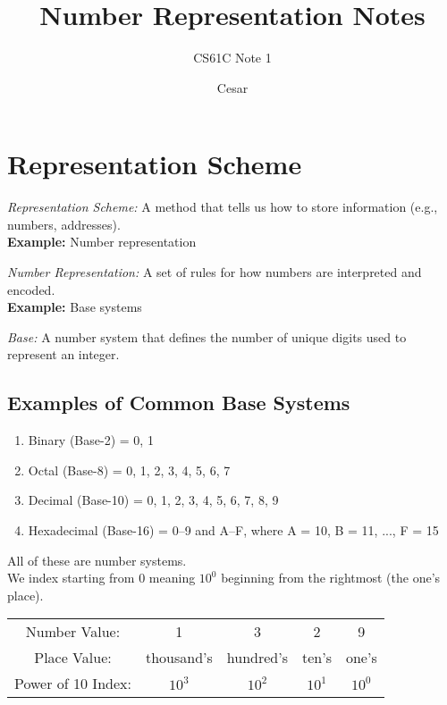 \documentclass{article}
\title{Number Representation Notes}
\author{CS61C Note 1}
\date{Cesar}
\begin{document}
\maketitle

\section{Representation Scheme}
\textit{Representation Scheme:} A method that tells us how to store information (e.g., numbers, addresses). \\

\noindent \textbf{Example:} Number representation 

\textit{Number Representation:} A set of rules for how numbers are interpreted and encoded. \\

\noindent \textbf{Example:} Base systems

\textit{Base:} A number system that defines the number of unique digits used to represent an integer. \\

\subsection*{Examples of Common Base Systems}
\begin{enumerate}
  \item Binary (Base-2) = 0, 1
  \item Octal (Base-8) = 0, 1, 2, 3, 4, 5, 6, 7
  \item Decimal (Base-10) = 0, 1, 2, 3, 4, 5, 6, 7, 8, 9
  \item Hexadecimal (Base-16) = 0--9 and A--F, where A = 10, B = 11, ..., F = 15
\end{enumerate}

\noindent All of these are number systems. \\

\noindent We index starting from $0$ meaning $10^0$ beginning from the rightmost (the one's place).

\begin{center}
\begin{tabular}{c c c c c}
Number Value: & 1 & 3 & 2 & 9 \\
Place Value:  & thousand's & hundred's & ten's & one's \\
Power of 10 Index:  & $10^3$ & $10^2$ & $10^1$ & $10^0$ \\
\end{tabular}
\end{center}
\end{document}
